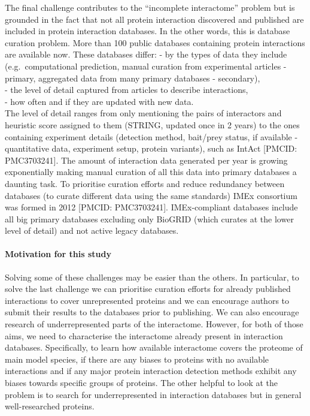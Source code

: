 \documentclass[]{article}
\let\oldparagraph\paragraph
\renewcommand{\paragraph}[1]{\oldparagraph{#1}\mbox{}}
\begin{document}
The final challenge contributes to the ``incomplete interactome''
problem but is grounded in the fact that not all protein interaction
discovered and published are included in protein interaction databases.
In the other words, this is database curation problem. More than 100
public databases containing protein interactions are available now.
These databases differ: - by the types of data they include
(e.g.~computational prediction, manual curation from experimental
articles - primary, aggregated data from many primary databases -
secondary),\\
- the level of detail captured from articles to describe interactions,\\
- how often and if they are updated with new data.\\
The level of detail ranges from only mentioning the pairs of interactors
and heuristic score assigned to them (STRING, updated once in 2 years)
to the ones containing experiment details (detection method, bait/prey
status, if available - quantitative data, experiment setup, protein
variants), such as IntAct {[}PMCID: PMC3703241{]}. The amount of
interaction data generated per year is growing exponentially making
manual curation of all this data into primary databases a daunting task.
To prioritise curation efforts and reduce redundancy between databases
(to curate different data using the same standards) IMEx consortium was
formed in 2012 {[}PMCID: PMC3703241{]}. IMEx-compliant databases include
all big primary databases excluding only BioGRID (which curates at the
lower level of detail) and not active legacy databases.

\paragraph{Motivation for this study}\label{motivation-for-this-study}

Solving some of these challenges may be easier than the others. In
particular, to solve the last challenge we can prioritise curation
efforts for already published interactions to cover unrepresented
proteins and we can encourage authors to submit their results to the
databases prior to publishing. We can also encourage research of
underrepresented parts of the interactome. However, for both of those
aims, we need to characterise the interactome already present in
interaction databases. Specifically, to learn how available interactome
covers the proteome of main model species, if there are any biases to
proteins with no available interactions and if any major protein
interaction detection methods exhibit any biases towards specific groups
of proteins. The other helpful to look at the problem is to search for
underrepresented in interaction databases but in general well-researched
proteins.
\end{document}
